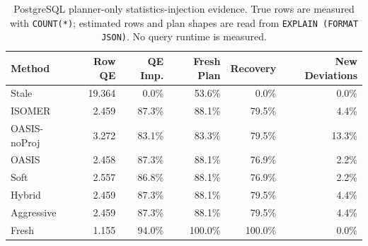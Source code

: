\begin{table}[t]
  \centering
  \small
  \caption{PostgreSQL planner-only statistics-injection evidence. True rows are measured with \texttt{COUNT(*)}; estimated rows and plan shapes are read from \texttt{EXPLAIN (FORMAT JSON)}. No query runtime is measured.}
  \label{tab:postgres_planner_stats_injection}
  \setlength{\tabcolsep}{4pt}
  \begin{tabular}{lrrrrr}
    \toprule
    Method & Row QE & QE Imp. & Fresh Plan & Recovery & New Deviations \\
    \midrule
    Stale & 19.364 & 0.0\% & 53.6\% & 0.0\% & 0.0\% \\
    ISOMER & 2.459 & 87.3\% & 88.1\% & 79.5\% & 4.4\% \\
    OASIS-noProj & 3.272 & 83.1\% & 83.3\% & 79.5\% & 13.3\% \\
    OASIS & 2.458 & 87.3\% & 88.1\% & 76.9\% & 2.2\% \\
    Soft & 2.557 & 86.8\% & 88.1\% & 76.9\% & 2.2\% \\
    Hybrid & 2.459 & 87.3\% & 88.1\% & 79.5\% & 4.4\% \\
    Aggressive & 2.459 & 87.3\% & 88.1\% & 79.5\% & 4.4\% \\
    Fresh & 1.155 & 94.0\% & 100.0\% & 100.0\% & 0.0\% \\
    \bottomrule
  \end{tabular}
\end{table}
